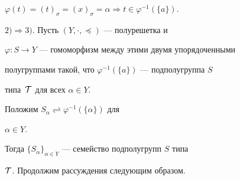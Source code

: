 $\varphi(t)=(t)_\sigma=(x)_\sigma=\alpha\Rightarrow 


t\in\varphi^{-1}(\{a\})$. 


\medskip 


 


$2)\Rightarrow 3)$. Пусть $(Y,\cdot,\preceq)$ --- полурешетка и 


$\varphi:S\to Y$ --- гомоморфизм между этими двумя упорядоченными 


полугруппами такой, что $\varphi^{-1}(\{a\})$ --- подполугруппа $S$ 


типа~$\cal T$ для всех $\alpha\in Y$. 


 


Положим $S_\alpha\rightleftharpoons\varphi^{-1}(\{\alpha\})$ для 


$\alpha\in Y$. 


Тогда $\{S_\alpha\}_{\alpha\in Y}$ --- семейство подполугрупп $S$ типа 


$\cal T$. Продолжим рассуждения следующим образом.


